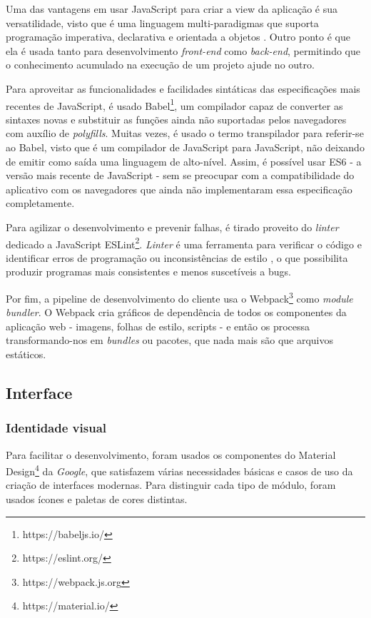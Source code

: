 Uma das vantagens em usar JavaScript para criar a view da aplicação é sua versatilidade, visto que é uma linguagem multi-paradigmas que suporta programação imperativa, declarativa e orientada a objetos \cite{mdnjs}. Outro ponto é que ela é usada tanto para desenvolvimento \emph{front-end} como \emph{back-end}, permitindo que o conhecimento acumulado na execução de um projeto ajude no outro.

Para aproveitar as funcionalidades e facilidades sintáticas das especificações mais recentes de JavaScript, é usado Babel\footnote{https://babeljs.io/}, um compilador capaz de converter as sintaxes novas e substituir as funções ainda não suportadas pelos navegadores com auxílio de \textit{polyfills}. Muitas vezes, é usado o termo transpilador para referir-se ao Babel, visto que é um compilador de JavaScript para JavaScript, não deixando de emitir como saída uma linguagem de alto-nível. Assim, é possível usar ES6 - a versão mais recente de JavaScript - sem se preocupar com a compatibilidade do aplicativo com os navegadores que ainda não implementaram essa especificação completamente.

Para agilizar o desenvolvimento e prevenir falhas, é tirado proveito do \textit{linter} dedicado a JavaScript ESLint\footnote{https://eslint.org/}. \textit{Linter} é uma ferramenta para verificar o código e identificar erros de programação ou inconsistências de estilo \cite{linter}, o que possibilita produzir programas mais consistentes e menos suscetíveis a bugs.

Por fim, a pipeline de desenvolvimento do cliente usa o Webpack\footnote{https://webpack.js.org} como \textit{module bundler}. O Webpack cria gráficos de dependência de todos os componentes da aplicação web - imagens, folhas de estilo, scripts - e então os processa transformando-nos em \textit{bundles} ou pacotes, que nada mais são que arquivos estáticos.

\subsection{Interface}

\subsubsection{Identidade visual}

Para facilitar o desenvolvimento, foram usados os componentes do Material Design\footnote{https://material.io/} da \emph{Google}, que satisfazem várias necessidades básicas e casos de uso da criação de interfaces modernas. Para distinguir cada tipo de módulo, foram usados ícones e paletas de cores distintas.

